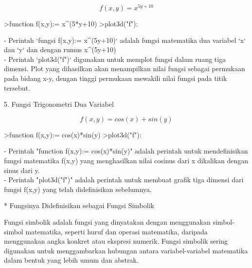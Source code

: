 \documentclass{article}
\begin{document}
\begin{eulernotebook}
\begin{eulercomment}
\begin{eulercomment}
\begin{eulercomment}
\end{eulercomment}
\begin{eulerformula}
\[
f(x,y)=x^{5y+10}
\]
\end{eulerformula}
\begin{eulerprompt}
>function f(x,y):= x^(5*y+10)
>plot3d("f"):
\end{eulerprompt}
\begin{eulercomment}
- Perintah `fungsi f(x,y):= x\textasciicircum{}(5y+10)` adalah fungsi matematika dua
variabel `x` dan `y` dan dengan rumus x\textasciicircum{}(5y+10)\\
- Perintah `plot3d("f")` digunakan untuk memplot fungsi dalam ruang
tiga dimensi. Plot yang dihasilkan akan menampilkan nilai fungsi
sebagai permukaan pada bidang x-y, dengan tinggi permukaan mewakili
nilai fungsi pada titik tersebut.

\end{eulercomment}
\eulersubheading{}
\begin{eulercomment}
5. Fungsi Trigonometri Dua Variabel

\end{eulercomment}
\begin{eulerformula}
\[
f(x,y)=cos(x)+sin(y)
\]
\end{eulerformula}
\begin{eulerprompt}
>function f(x,y):= cos(x)*sin(y)
>plot3d("f"):
\end{eulerprompt}
\begin{eulercomment}
- Perintah "function f(x,y):= cos(x)*sin(y)" adalah perintah untuk
mendefinisikan fungsi matematika f(x,y) yang menghasilkan nilai
cosinus dari x dikalikan dengan sinus dari y.\\
- Perintah "plot3d("f")" adalah perintah untuk membuat grafik tiga
dimensi dari fungsi f(x,y) yang telah didefinisikan sebelumnya.



\begin{eulercomment}
\begin{eulercomment}
* Fungsinya Didefinisikan sebagai Fungsi Simbolik

\end{eulercomment}
\begin{eulercomment}
Fungsi simbolik adalah fungsi yang dinyatakan dengan menggunakan
simbol-simbol matematika, seperti huruf dan operasi matematika,
daripada menggunakan angka konkret atau ekspresi numerik. Fungsi
simbolik sering digunakan untuk menggambarkan hubungan antara
variabel-variabel matematika dalam bentuk yang lebih umum dan abstrak.


\end{eulercomment}
\end{eulercomment}
\end{eulercomment}
\end{eulercomment}
\end{eulercomment}
\end{eulernotebook}
\end{document}
